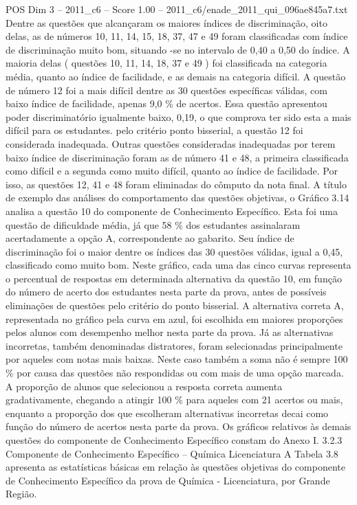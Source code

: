 \begin{textsample}{POS Dim 3 – 2011\_c6 – Score 1.00 – 2011\_c6/enade\_2011\_qui\_096ae845a7.txt}
Dentre as questões que alcançaram os maiores índices de discriminação, oito delas, as de números 10, 11, 14, 15, 18, 37, 47 e 49 foram classificadas com índice de discriminação muito bom, situando -se no intervalo de 0,40 a 0,50 do índice.
A maioria delas ( questões 10, 11, 14, 18, 37 e 49 ) foi classificada na categoria média, quanto ao índice de facilidade, e as demais na categoria difícil.
A questão de número 12 foi a mais difícil dentre as 30 questões específicas válidas, com baixo índice de facilidade, apenas 9,0 \% de acertos.
Essa questão apresentou poder discriminatório igualmente baixo, 0,19, o que comprova ter sido esta a mais difícil para os estudantes. pelo critério ponto bisserial, a questão 12 foi considerada inadequada.
Outras questões consideradas inadequadas por terem baixo índice de discriminação foram as de número 41 e 48, a primeira classificada como difícil e a segunda como muito difícil, quanto ao índice de facilidade.
Por isso, as questões 12, 41 e 48 foram eliminadas do cômputo da nota final.
A título de exemplo das análises do comportamento das questões objetivas, o Gráfico 3.14 analisa a questão 10 do componente de Conhecimento Específico.
Esta foi uma questão de dificuldade média, já que 58 \% dos estudantes assinalaram acertadamente a opção A, correspondente ao gabarito.
Seu índice de discriminação foi o maior dentre os índices das 30 questões válidas, igual a 0,45, classificado como muito bom.
Neste gráfico, cada uma das cinco curvas representa o percentual de respostas em determinada alternativa da questão 10, em função do número de acerto dos estudantes nesta parte da prova, antes de possíveis eliminações de questões pelo critério do ponto bisserial.
A alternativa correta A, representada no gráfico pela curva em azul, foi escolhida em maiores proporções pelos alunos com desempenho melhor nesta parte da prova.
Já as alternativas incorretas, também denominadas distratores, foram selecionadas principalmente por aqueles com notas mais baixas.
Neste caso também a soma não é sempre 100 \% por causa das questões não respondidas ou com mais de uma opção marcada.
A proporção de alunos que selecionou a resposta correta aumenta gradativamente, chegando a atingir 100 \% para aqueles com 21 acertos ou mais, enquanto a proporção dos que escolheram alternativas incorretas decai como função do número de acertos nesta parte da prova.
Os gráficos relativos às demais questões do componente de Conhecimento Específico constam do Anexo I. 3.2.3 Componente de Conhecimento Específico – Química Licenciatura A Tabela 3.8 apresenta as estatísticas básicas em relação às questões objetivas do componente de Conhecimento Específico da prova de Química - Licenciatura, por Grande Região.

\end{textsample}
